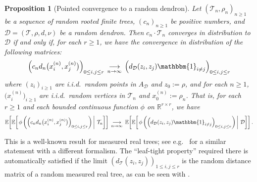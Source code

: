 \documentclass{article}
\newtheorem{proposition}[theorem]{Proposition}
\theoremstyle{remark}
\newcommand{\bR}{\mathbb{R}}
\newcommand{\cv}[1]{\,\underset{#1}{\longrightarrow}\,}
\newcommand{\cT}{\mathcal{T}}
\newcommand{\cD}{\mathcal{D}}
\newcommand{\expec}[1]{\mathbb{E}{\left[#1\right]}}
\newcommand{\expecond}[2]{\mathbb{E}{\left[\left. #1 \,\right|\, #2 \right]}}
\newcommand{\One}[1]{\mathbbm{1}_{#1}}
\begin{document}
\begin{proposition}[Pointed convergence to a random dendron]
\label{prop: convergence to a random dendron}
    Let $(\cT_n, \rho_n)_{n\ge1}$ be a sequence of random rooted finite trees, $(c_n)_{n\ge1}$ be positive numbers, and $\cD=(\cT,\rho,d,\nu)$ be a random dendron.
    Then $c_n \cdot \cT_n$ converges in distribution to $\cD$ if and only if, for each $r\ge1$, we have the convergence in distribution of the following matrices:
    \begin{equation*}
        \left( c_n d_n{\big( x_i^{(n)}, x_j^{(n)} \big)} \right)_{0\le i,j\le r}
        \cv{n\to\infty}
        \left( d_\cD{\left(z_i, z_j\right)} \One{i\ne j} \right)_{0\le i,j\le r}
    \end{equation*}
    where $(z_i)_{i\ge1}$ are i.i.d.~random points in $A_\cD$ and $z_0 := \rho$, 
    and for each $n\ge1$, $\big(x_i^{(n)}\big)_{i\ge1}$ are i.i.d.~random vertices in $\cT_n$ and $x_0^{(n)} := \rho_n$.
    That is, for each $r\ge1$ and each bounded continuous function $\phi$ on $\bR^{r\times r}$, we have
    \begin{equation*}
        \expec{ \expecond{ \phi\left(\left( c_n d_n{\big( x_i^{(n)}, x_j^{(n)} \big)} \right)_{0\le i,j\le r}\right) }{ \cT_n } }
        \cv{n\to\infty}
        \expec{ \expecond{ \phi\left(\left( d_\cD{\left(z_i, z_j\right)} \One{i\ne j} \right)_{0\le i,j\le r}\right) }{ \cD } } \,.
    \end{equation*}
\end{proposition}

This is a well-known result for measured real trees; see e.g.~\cite[Theorem~3(i)]{Aldous_1993} for a similar statement with a different formalism.
The ``leaf-tight property'' required there is automatically satisfied if the limit $\left( d_\cT{\left(z_i, z_j\right)} \right)_{1\le i,j\le r}$ is the random distance matrix of a random measured real tree, as can be seen with \cite[Theorem~3(ii)]{Aldous_1993}.
\end{document}
